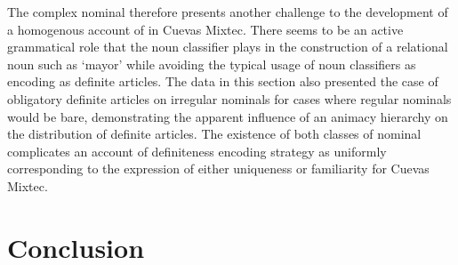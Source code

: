\documentclass[output=paper,modfonts,nonflat]{langsci/langscibook}
\begin{document}
The complex nominal therefore presents another challenge to the development of a homogenous account of  in Cuevas Mixtec.  There seems to be an active grammatical role that the noun classifier plays in the construction of a relational noun such as `mayor' while avoiding the typical usage of noun classifiers as encoding  as definite articles.
The data in this section also presented the case of obligatory definite articles on irregular nominals for cases where regular nominals would be bare, demonstrating the apparent influence of an animacy hierarchy on the distribution of definite articles.  The existence of both classes of nominal complicates an account of definiteness encoding strategy as uniformly corresponding to the expression of either uniqueness or familiarity for Cuevas Mixtec.

\section{Conclusion} \label{sec:cisneros:6}
\end{document}
